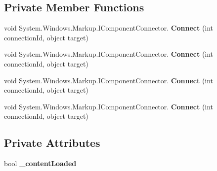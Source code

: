 \subsection*{Private Member Functions}
\begin{DoxyCompactItemize}
\item 
\mbox{\label{class_t_h_b___plugin___social_1_1_personal_statistic_1_1_personal_statistic_a2caa604388601555e72bad0ce97f0c03}} 
void System.\+Windows.\+Markup.\+I\+Component\+Connector. {\bfseries Connect} (int connection\+Id, object target)
\item 
\mbox{\label{class_t_h_b___plugin___social_1_1_personal_statistic_1_1_personal_statistic_a2caa604388601555e72bad0ce97f0c03}} 
void System.\+Windows.\+Markup.\+I\+Component\+Connector. {\bfseries Connect} (int connection\+Id, object target)
\item 
\mbox{\label{class_t_h_b___plugin___social_1_1_personal_statistic_1_1_personal_statistic_a2caa604388601555e72bad0ce97f0c03}} 
void System.\+Windows.\+Markup.\+I\+Component\+Connector. {\bfseries Connect} (int connection\+Id, object target)
\item 
\mbox{\label{class_t_h_b___plugin___social_1_1_personal_statistic_1_1_personal_statistic_a2caa604388601555e72bad0ce97f0c03}} 
void System.\+Windows.\+Markup.\+I\+Component\+Connector. {\bfseries Connect} (int connection\+Id, object target)
\end{DoxyCompactItemize}
\subsection*{Private Attributes}
\begin{DoxyCompactItemize}
\item 
\mbox{\label{class_t_h_b___plugin___social_1_1_personal_statistic_1_1_personal_statistic_a037d8487091d3848a7e6f0e96170ca0c}} 
bool {\bfseries \+\_\+content\+Loaded}
\end{DoxyCompactItemize}


